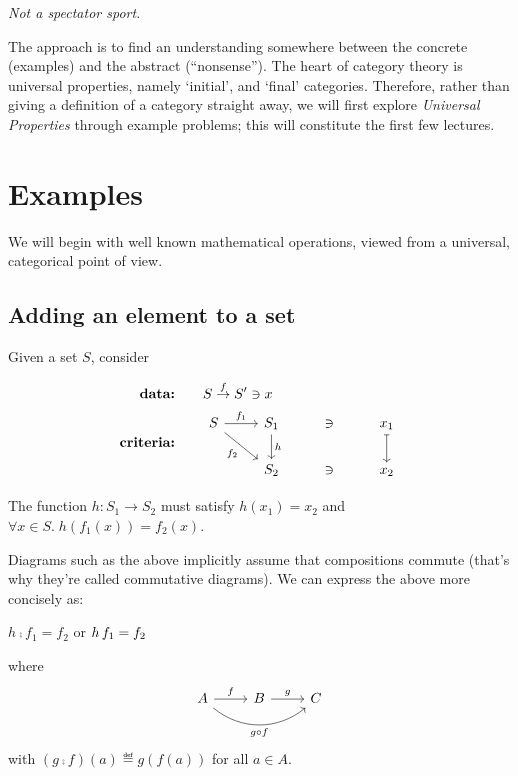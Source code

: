 \emph{Not a spectator sport.}

The approach is to find an understanding somewhere between the concrete
(examples) and the abstract (``nonsense''). The heart of category theory is
universal properties, namely `initial', and `final' categories. Therefore,
rather than giving a definition of a category straight away, we will first
explore \emph{Universal Properties} through example problems; this will
constitute the first few lectures.

\section{Examples}
We will begin with well known mathematical operations, viewed from a universal,
categorical point of view.

\subsection{Adding an element to a set}
\label{add-element-set}

Given a set $S$, consider

\begin{align*}
    \textbf{data:}&\qquad S \overset{f}{\rightarrow} S^\prime \ni x \\
    \textbf{criteria:}& \qquad 
    \begin{tikzcd}[ampersand replacement=\&]
        S \arrow[r, "f_1"]
          \arrow[dr, swap, "f_2"]
          \&
        S_1 \arrow[d, "h"] \& \ni \& x_1 \arrow[d, mapsto]
          \\
          {}\&
        S_2 \& \ni \& x_2
    \end{tikzcd}
\end{align*}

The function $h : S_1 \rightarrow S_2$ must satisfy $h(x_1) = x_2$ and 
$\forall x \in S .\; h(f_1(x)) = f_2(x)$.

\begin{framed}
Diagrams such as the above implicitly assume that compositions commute (that's
why they're called commutative diagrams). We can express the above more
concisely as:
\begin{center}
$h\comp f_1 = f_2$
\quad or \quad
$h\, f_1 = f_2$
\end{center}
where 
$$
\begin{tikzcd}
    A \arrow[r, "f"] \arrow[rr, swap, bend right=40, "g \circ f"] & B \arrow[r, "g"] & C
\end{tikzcd}
$$
with $(g\comp f)(a)\eqdef g(f(a))$ for all $a\in A$.
\end{framed}


